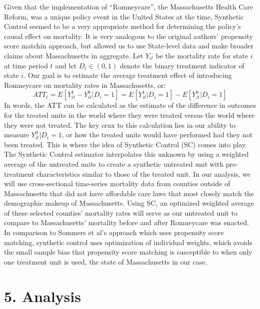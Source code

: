 \documentclass[
]{article}
\begin{document}
Given that the implementation of ``Romneycare'', the Massachusetts
Health Care Reform, was a unique policy event in the United States at
the time, Synthetic Control seemed to be a very appropriate method for
determining the policy's causal effect on mortality. It is very
analogous to the original authors' propensity score matchin approach,
but allowed us to use State-level data and make broader claims about
Massachusetts in aggregate. Let \(Y_{it}\) be the mortality rate for
state \(i\) at time period \(t\) and let \(D_i \in (0,1)\) denote the
binary treatment indicator of state \(i\). Our goal is to estimate the
average treatment effect of introducing Romneycare on mortality rates in
Massachusetts, or:
\[ATT_t = E[Y_{it}^1 - Y_{it}^0 | D_i = 1] = E[Y_{it}^1|D_i = 1] - E[Y_{it}^0|D_i = 1]\]
In words, the ATT can be calculated as the estimate of the difference in
outcomes for the treated units in the world where they were treated
versus the world where they were not treated. The key crux to this
calculation lies in our ability to measure \(Y_{it}^0|D_i=1\), or how
the treated units would have performed had they not been treated. This
is where the idea of Synthetic Control (SC) comes into play. The
Synthetic Control estimator interpolates this unknown by using a
weighted average of the untreated units to create a synthetic untreated
unit with pre-treatment characteristics similar to those of the treated
unit. In our analysis, we will use cross-sectional time-series mortality
data from counties outside of Massachusetts that did not have affordable
care laws that most closely match the demographic makeup of
Massachusetts. Using SC, an optimized weighted average of these selected
counties' mortality rates will serve as our untreated unit to compare to
Massachusetts' mortality before and after Romneycare was enacted. In
comparison to Sommers et al's approach which uses propensity score
matching, synthetic control uses optimization of individual weights,
which avoids the small sample bias that propensity score matching is
susceptible to when only one treatment unit is used, the state of
Massachusetts in our case.

\hypertarget{analysis}{%
\section{5. Analysis}\label{analysis}}
\end{document}
